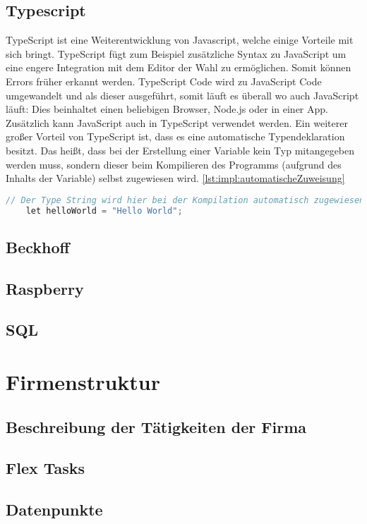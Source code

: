 \subsection{Typescript}
TypeScript ist eine Weiterentwicklung von Javascript, welche einige Vorteile mit sich bringt. TypeScript fügt zum Beispiel zusätzliche Syntax zu JavaScript um eine engere Integration mit dem Editor der Wahl zu ermöglichen. Somit können Errors früher erkannt werden. TypeScript Code wird zu JavaScript Code umgewandelt und als dieser ausgeführt, somit läuft es überall wo auch JavaScript läuft: Dies beinhaltet einen beliebigen Browser, Node.js oder in einer App. Zusätzlich kann JavaScript auch in TypeScript verwendet werden. Ein weiterer großer Vorteil von TypeScript ist, dass es eine automatische Typendeklaration besitzt. Das heißt, dass bei der Erstellung einer Variable kein Typ mitangegeben werden muss, sondern dieser beim Kompilieren des Programms (aufgrund des Inhalts der Variable) selbst zugewiesen wird. \ref{lst:impl:automatischeZuweisung}

\begin{lstlisting}[language=java,caption=TypeScript automatische Zuweisung,label=lst:impl:automatischeZuweisung]
    // Der Type String wird hier bei der Kompilation automatisch zugewiesen
    let helloWorld = "Hello World";
\end{lstlisting}

\subsection{Beckhoff}
\subsection{Raspberry}

\subsection{SQL}

\section{Firmenstruktur}


\subsection{Beschreibung der Tätigkeiten der Firma}
\subsection{Flex Tasks}
\subsection{Datenpunkte}
